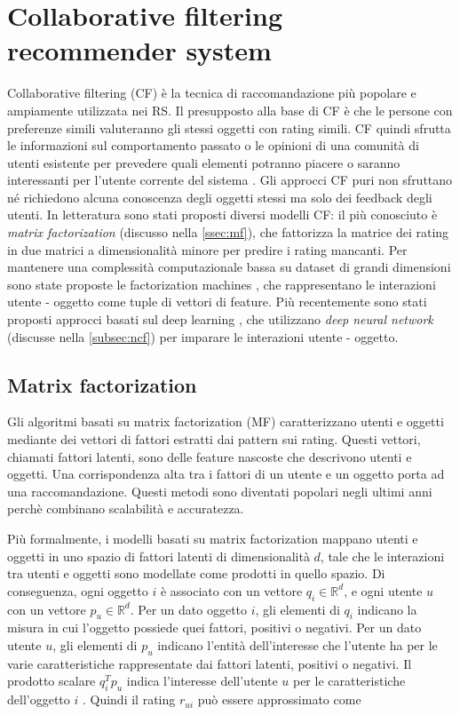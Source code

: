 \documentclass[12pt,italian]{report}
\begin{document}
\section{Collaborative filtering recommender system}
Collaborative filtering (CF) è la tecnica di raccomandazione più popolare e ampiamente utilizzata nei RS.
Il presupposto alla base di CF è che le persone con preferenze simili valuteranno gli stessi oggetti con rating simili. CF quindi sfrutta le informazioni sul comportamento passato o le opinioni di una comunità di utenti esistente per prevedere quali elementi potranno piacere o saranno interessanti per l'utente corrente del sistema \cite{recsys-intro}. Gli approcci CF puri non sfruttano né richiedono alcuna conoscenza degli oggetti stessi ma solo dei feedback degli utenti. In letteratura sono stati proposti diversi modelli CF: il più conosciuto è \textit{matrix  factorization} \cite{matrix-factorization} (discusso nella \autoref{ssec:mf}), che fattorizza la matrice dei rating in due matrici a dimensionalità minore per predire i rating mancanti. Per mantenere una complessità computazionale bassa su dataset di grandi dimensioni sono state proposte le factorization machines \cite{factorization-machines}, che rappresentano le interazioni utente - oggetto come tuple di vettori di feature. Più recentemente sono stati proposti approcci basati sul deep learning \cite{deep-learning-survey} \cite{NCF}, che utilizzano \textit{deep neural network} (discusse nella \autoref{subsec:ncf}) per imparare le interazioni utente - oggetto.

\subsection{Matrix factorization} \label{ssec:mf}
Gli algoritmi basati su matrix factorization (MF) caratterizzano utenti e oggetti mediante dei vettori di fattori estratti dai pattern sui rating. Questi vettori, chiamati fattori latenti, sono delle feature nascoste che descrivono utenti e oggetti. Una corrispondenza alta tra i fattori di un utente e un oggetto porta ad una raccomandazione. Questi metodi sono diventati popolari negli ultimi anni perchè combinano scalabilità e accuratezza. %

Più formalmente, i modelli basati su matrix factorization mappano utenti e oggetti in uno spazio di fattori latenti di dimensionalità $d$, tale che le interazioni tra utenti e oggetti sono modellate come prodotti in quello spazio. Di conseguenza, ogni oggetto $i$ è associato con un vettore $q_i \in \mathbb{R}^d$, e ogni utente $u$ con un vettore $p_u \in \mathbb{R}^d$. Per un dato oggetto $i$, gli elementi di $q_i$ indicano la misura in cui l'oggetto possiede quei fattori, positivi o negativi. Per un dato utente $u$, gli elementi di $p_u$ indicano l'entità dell'interesse che l'utente ha per le varie caratteristiche rappresentate dai fattori latenti, positivi o negativi. Il prodotto scalare $q_i^Tp_u$ indica l'interesse dell'utente $u$ per le caratteristiche dell'oggetto $i$ \cite{matrix-factorization}. Quindi il rating $r_{ui}$ può essere approssimato come
\end{document}
